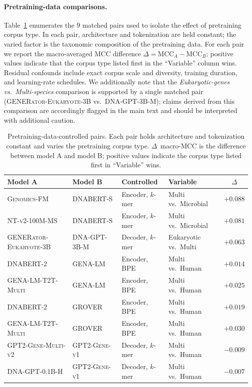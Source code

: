 \documentclass{llmxive}
\begin{document}
\paragraph{Pretraining-data comparisons.}
Table~\ref{tab:pairs_pretraining} enumerates the $9$ matched pairs
used to isolate the effect of pretraining corpus type. In each pair,
architecture and tokenization are held constant; the varied factor is
the taxonomic composition of the pretraining data. For each pair we
report the macro-averaged MCC difference $\Delta = \text{MCC}_A -
\text{MCC}_B$; positive values indicate that the corpus type listed
first in the ``Variable'' column wins. Residual confounds include
exact corpus scale and diversity, training duration, and learning-rate
schedules. We additionally note that the \emph{Eukaryotic-genes vs.\
Multi-species} comparison is supported by a single matched pair
(\textsc{GENERator-Eukaryote-3B} vs.\ \textsc{DNA-GPT-3B-M}); claims
derived from this comparison are accordingly flagged in the main text
and should be interpreted with additional caution.

\begin{table}[!htbp]
\centering
\small
\begin{tabular}{@{}llllc@{}}
\toprule
\textbf{Model A} & \textbf{Model B} & \textbf{Controlled} & \textbf{Variable} & \textbf{$\Delta$} \\
\midrule
\textsc{Genomics-FM}            & \textsc{DNABERT-S}     & Encoder, $k$-mer  & Multi vs.\ Microbial    & $+0.088$ \\
\textsc{NT-v2-100M-MS}          & \textsc{DNABERT-S}     & Encoder, $k$-mer  & Multi vs.\ Microbial    & $+0.081$ \\
\midrule
\textsc{GENERator-Eukaryote-3B} & \textsc{DNA-GPT-3B-M}  & Decoder, $k$-mer  & Eukaryotic vs.\ Multi   & $+0.063$ \\
\midrule
\textsc{DNABERT-2}              & \textsc{GENA-LM}       & Encoder, BPE      & Multi vs.\ Human        & $+0.014$ \\
\textsc{GENA-LM-T2T-Multi}      & \textsc{GENA-LM}       & Encoder, BPE      & Multi vs.\ Human        & $+0.025$ \\
\textsc{DNABERT-2}              & \textsc{GROVER}        & Encoder, BPE      & Multi vs.\ Human        & $+0.019$ \\
\textsc{GENA-LM-T2T-Multi}      & \textsc{GROVER}        & Encoder, BPE      & Multi vs.\ Human        & $+0.030$ \\
\textsc{GPT2-Gene-Multi-v2}     & \textsc{GPT2-Gene-v1}  & Decoder, $k$-mer  & Multi vs.\ Human        & $-0.009$ \\
\textsc{DNA-GPT-0.1B-H}         & \textsc{GPT2-Gene-v1}  & Decoder, $k$-mer  & Multi vs.\ Human        & $-0.007$ \\
\bottomrule
\end{tabular}
\caption{Pretraining-data-controlled pairs. Each pair holds
architecture and tokenization constant and varies the pretraining
corpus type. $\Delta$~macro-MCC is the difference between model A and
model B; positive values indicate the corpus type listed first in
``Variable'' wins.}
\label{tab:pairs_pretraining}
\end{table}
\end{document}
